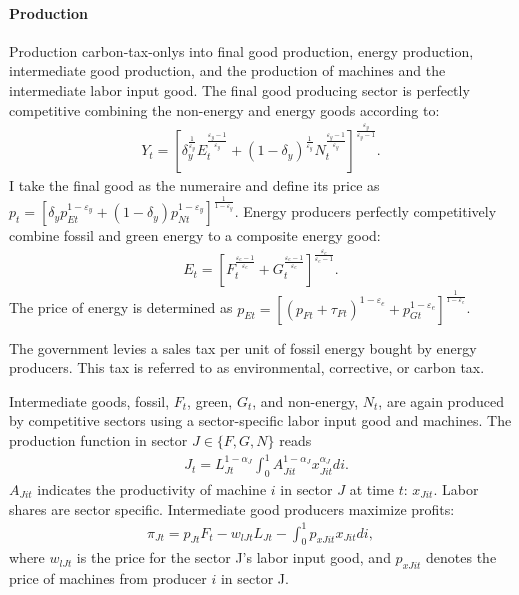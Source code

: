 \paragraph{Production}
Production carbon-tax-onlys into final good production, energy production, intermediate good production, and the production of machines and the intermediate labor input good. 
The final good producing sector is perfectly competitive combining the non-energy and energy goods according to:
\begin{align*}
Y_t=\left[\delta_y^\frac{1}{\varepsilon_y}E_{t}^{\frac{\varepsilon_y-1}{\varepsilon_y}}+(1-\delta_y)^\frac{1}{\varepsilon_y}N_{t}^{\frac{\varepsilon_y-1}{\varepsilon_y}}\right]^\frac{\varepsilon_y}{\varepsilon_y-1}.
\end{align*} 
I take the final good as the numeraire and define its price as $p_t=\left[\delta_yp_{Et}^{1-\varepsilon_y}+(1-\delta_y)p_{Nt}^{1-\varepsilon_y}\right]^{\frac{1}{1-\varepsilon_y}}$.
Energy producers perfectly competitively combine fossil and green energy to a composite energy good:
\begin{align*}
E_t=\left[F_t^\frac{\varepsilon_e-1}{\varepsilon_e}+G_t^\frac{\varepsilon_e-1}{\varepsilon_e}\right]^\frac{\varepsilon_e}{\varepsilon_e-1}.
\end{align*}
The price of energy is determined as  $p_{Et}= \left[(p_{Ft}+\tau_{Ft})^{1-\varepsilon_e}+p_{Gt}^{1-\varepsilon_e}\right]^\frac{1}{{1-\varepsilon_e}}$.



The government levies a sales tax per unit of fossil energy bought by energy producers. This tax is referred to as environmental, corrective, or carbon tax. 

Intermediate goods, fossil, $F_t$, green, $G_t$, and non-energy, $N_t$, are again produced by competitive sectors using a sector-specific labor input good and machines. The production function in sector $J\in \{F,G,N\}$ reads
\begin{align*}
&J_{t}= L_{Jt}^{1-\alpha_J}\int_{0}^{1}A_{Jit}^{1-\alpha_J}x_{Jit}^{\alpha_J} di.
\end{align*}
$A_{Jit}$ indicates the productivity of machine $i$ in sector $J$ at time $t$: $x_{Jit}$. 
Labor shares are sector specific. 
Intermediate good producers maximize profits: 
\begin{align*}
\pi_{Jt}=p_{Jt}F_t-w_{lJt}L_{Jt}-\int_{0}^{1}p_{xJit}x_{Jit}di,
\end{align*}
where $w_{lJt}$ is the price for the sector J's labor input good, and $p_{xJit}$ denotes the price of machines from producer $i$ in sector J. 

